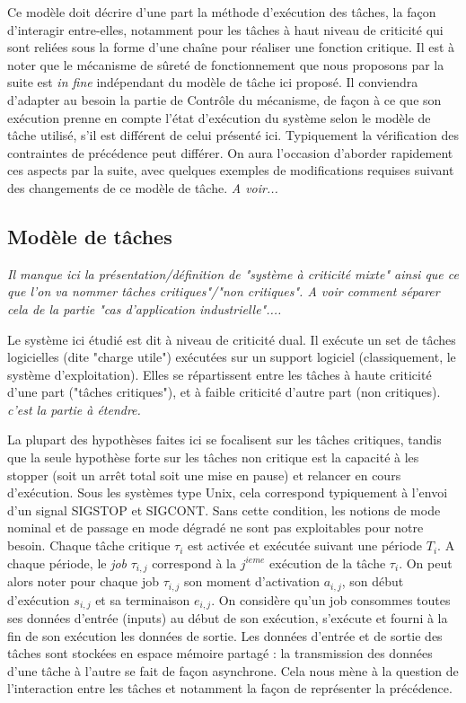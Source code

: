 \documentclass[french, a4paper, 11pt, twoside, pdftex]{StyleThese}
\begin{document}
    
    Ce modèle doit décrire d'une part la méthode d'exécution des tâches, la façon d'interagir entre-elles, notamment pour les tâches à haut niveau de criticité qui sont reliées sous la forme d'une chaîne pour réaliser une fonction critique. Il est à noter que le mécanisme de sûreté de fonctionnement que nous proposons par la suite est \textit{in fine} indépendant du modèle de tâche ici proposé. Il conviendra d'adapter au besoin la partie de Contrôle du mécanisme, de façon à ce que son exécution prenne en compte l'état d'exécution du système selon le modèle de tâche utilisé, s'il est différent de celui présenté ici. Typiquement la vérification des contraintes de précédence peut différer. On aura l'occasion d'aborder rapidement ces aspects par la suite, avec quelques exemples de modifications requises suivant des changements de ce modèle de tâche. \textit{A voir...}
    
    \subsection{Modèle de tâches}
        \textit{Il manque ici la présentation/définition de "système à criticité mixte" ainsi que ce que l'on va nommer tâches critiques"/"non critiques".  A voir comment séparer cela de la partie "cas d'application industrielle".... }

    Le système ici étudié est dit à niveau de criticité dual. Il exécute un set de tâches logicielles (dite "charge utile") exécutées sur un support logiciel (classiquement, le système d'exploitation). Elles se répartissent entre les tâches à haute criticité d'une part ("tâches critiques"), et à faible criticité d'autre part (non critiques). \textit{c'est la partie à étendre.}
    
    La plupart des hypothèses faites ici se focalisent sur les tâches critiques, tandis que la seule hypothèse forte sur les tâches non critique est la capacité à les stopper (soit un arrêt total soit une mise en pause) et relancer en cours d'exécution. Sous les systèmes type Unix, cela correspond typiquement à l'envoi d'un signal SIGSTOP et SIGCONT. Sans cette condition, les notions de mode nominal et de passage en mode dégradé ne sont pas exploitables pour notre besoin. 
    Chaque tâche critique $\tau_i$ est activée et exécutée suivant une période $T_i$. A chaque période, le \textit{job} $\tau_{i,j}$ correspond à la $j^{ieme}$ exécution de la tâche $\tau_i$. On peut alors noter pour chaque job $\tau_{i,j}$ son moment d'activation $a_{i,j}$, son début d'exécution $s_{i,j}$ et sa terminaison $e_{i,j}$. On considère qu'un job consommes toutes ses données d'entrée (inputs) au début de son exécution, s'exécute et fourni à la fin de son exécution les données de sortie. Les données d'entrée et de sortie des tâches sont stockées en espace mémoire partagé : la transmission des données d'une tâche à l'autre se fait de façon asynchrone.
    Cela nous mène à la question de l'interaction entre les tâches et notamment la façon de représenter la précédence.
\end{document}
